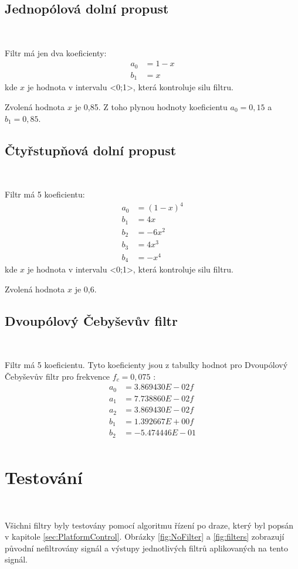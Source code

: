 \subsection{Jednopólová dolní propust}\

Filtr má jen dva koeficienty:
\begin{align}
a_0 &= 1 - x \\
b_1 &= x
\end{align}
kde $x$ je hodnota v intervalu <0;1>, která kontroluje silu filtru\cite{Filters}.

Zvolená hodnota $x$ je 0,85. Z toho plynou hodnoty koeficientu $a_0 = 0,15$ a 
$b_1 = 0,85$.

\subsection{Čtyřstupňová dolní propust}\

Filtr má 5 koeficientu:
\begin{align}
a_0 &= (1 - x)^4 \\
b_1 &= 4x \\
b_2 &= -6x^2 \\
b_3 &= 4x^3 \\
b_4 &= -x^4
\end{align}
kde $x$ je hodnota v intervalu <0;1>, která kontroluje silu filtru\cite{Filters}.

Zvolená hodnota $x$ je 0,6.

\subsection{Dvoupólový Čebyševův filtr}\

Filtr má 5 koeficientu. Tyto koeficienty jsou z tabulky hodnot pro Dvoupólový Čebyševův filtr pro frekvence $f_c = 0,075$ \cite{Filters}:
\begin{align}
a_0 &= 3.869430E-02f \\
a_1 &= 7.738860E-02f \\
a_2 &= 3.869430E-02f \\
b_1 &= 1.392667E+00f \\
b_2 &= -5.474446E-01 \\
\end{align}

\section{Testování}\

Všichni filtry byly testovány pomocí algoritmu řízení po draze, který byl popsán
v kapitole \ref{sec:PlatformControl}. Obrázky \ref{fig:NoFilter} a \ref{fig:filters} 
zobrazují původní nefiltrovány signál a výstupy jednotlivých filtrů 
aplikovaných na tento signál.

